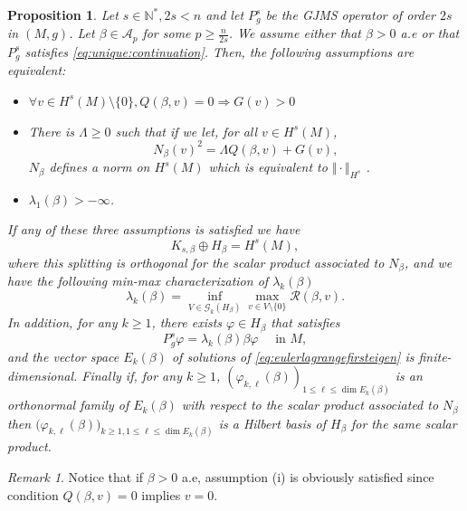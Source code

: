 \documentclass[10pt]{amsart}
\numberwithin{equation}{section}
\newcommand{\vp}{\varphi}
\theoremstyle{plain}
\newtheorem{prop}[theo]{Proposition}%
\theoremstyle{remark}
\newtheorem{rem}{Remark}[section]
\begin{document}
\begin{prop} \label{prop:wellposedmu_1}
Let $s \in \mathbb{N}^*, 2s <n$ and let $P_g^s$ be the GJMS operator of order $2s$ in $(M,g)$. Let $\beta \in \mathcal{A}_p$ for some $p\geq \frac{n}{2s}$. We assume either that $\beta >0$ a.e or that $P_g^s$ satisfies \eqref{eq:unique:continuation}. Then, the following assumptions are equivalent:
\begin{itemize}
\item[(i)]$ \forall v \in H^s(M)\setminus\{0\}, Q(\beta,v) = 0 \Rightarrow G(v) > 0 $
\item[(ii)] There is $\Lambda \geq 0$ such that if we let, for all $v \in H^s(M)$, %
$$ N_\beta (v)^2= \Lambda Q(\beta,v) + G(v) ,$$
$N_\beta$ defines a norm on $H^s(M)$ which is equivalent to $\Vert \cdot \Vert_{H^s}$ .
\item[(iii)] $\lambda_1(\beta)>-\infty$.
\end{itemize}
If any of these three assumptions is satisfied %
we have
\begin{equation} \label{eq:directsumKbetaHbeta} K_{s,\beta} \oplus H_\beta = H^s(M), \end{equation}
where this splitting is orthogonal for the scalar product associated to $N_{\beta}$, and we have the following min-max characterization of $\lambda_k(\beta)$
\begin{equation} \label{eq:newminmu1} \lambda_k(\beta) = \inf_{V \in \mathcal{G}_k(H_\beta)} \max_{v \in V \setminus \{0\}} \mathcal{R}(\beta,v). \end{equation}
In addition, for any $k \ge 1$, there exists $\vp \in H_\beta$ that satisfies
\begin{equation}\label{eq:eulerlagrangefirsteigen} P_g^s \vp = \lambda_k(\beta) \beta \vp \quad \text{ in } M, \end{equation}
and the vector space $E_k(\beta)$ of solutions of \eqref{eq:eulerlagrangefirsteigen} is finite-dimensional. Finally if, for any $k \ge 1$, $(\vp_{k,\ell}(\beta))_{1 \le \ell \le \dim E_k(\beta)}$ is an orthonormal family of $E_k(\beta)$ with respect to the scalar product associated to $N_{\beta}$ then $\big( \vp_{k,\ell}(\beta)\big)_{k \ge 1, 1 \le \ell \le \dim E_k(\beta)}$ is a Hilbert basis of $H_\beta$ for the same scalar product.
\end{prop}

\begin{rem}
Notice that if $\beta > 0$ a.e, assumption (i) is obviously satisfied since condition $Q(\beta,v) = 0$ implies $v=0$.
\end{rem}
\end{document}
